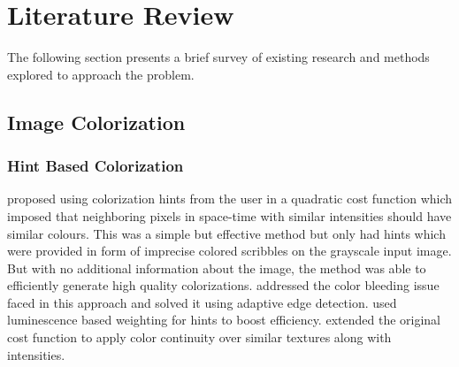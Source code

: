 \documentclass{article} %
\begin{document}
\section{Literature Review}
The following section presents a brief survey of existing research and methods explored to approach the problem.
\subsection{Image Colorization}
\subsubsection{Hint Based Colorization}
\hspace*{0.167 in}\citet{levin2004colorization} proposed using colorization hints from the user in a quadratic cost function which imposed that neighboring pixels in space-time with similar intensities should have similar colours. This was a simple but effective method but only had hints which were provided in form of imprecise colored scribbles on the grayscale input image. But with no additional information about the image, the method was able to efficiently generate high quality colorizations. \cite{huang2005edge} addressed the color bleeding issue faced in this approach and solved it using adaptive edge detection. \cite{yatziv2006chrominance} used luminescence based weighting for hints to boost efficiency. \cite{qu2006manga} extended the original cost function to apply color continuity over similar textures along with intensities.
\end{document}

